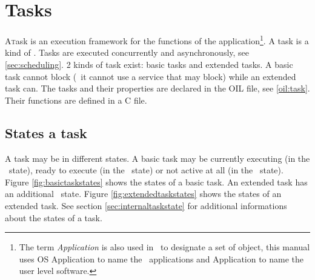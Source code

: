 
\chapter{Tasks}
\label{chap:tasks}

\lettrine{A} task is an execution framework for the functions of the application\footnote{The term {\em Application} is also used in \autosar\ to designate a set of object, this manual uses OS Application to name the \autosar\ applications and Application to name the user level software.}. A task is a kind of \process. Tasks are executed concurrently and asynchronously, see \ref{sec:scheduling}. 2 kinds of task exist: basic tasks and extended tasks. A basic task cannot block (\ie\ it cannot use a service that may block) while an extended task can.
The tasks and their properties are declared in the OIL file, see \ref{oil:task}. Their functions are defined in a C file.

\section{States a task}
\label{sec:taskstate}

A task may be in different states. A basic task may be currently executing (in the \RUNNING\ state), ready to execute (in the \READY\ state) or not active at all (in the \SUSPENDED\ state). Figure \ref{fig:basictaskstates} shows the states of a basic task. An extended task has an additional \WAITING\ state.  Figure \ref{fig:extendedtaskstates} shows the states of an extended task. See section \ref{sec:internaltaskstate} for additional informations about the states of a task.

